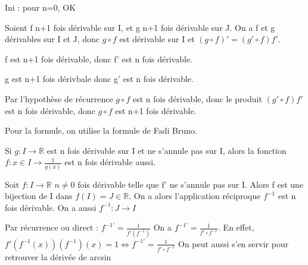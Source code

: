 \documentclass[french]{yLectureNote}
\begin{document}
\begin{myproof}
Ini : pour n=0, OK

Soient f n+1 fois dérivable sur I, et g n+1 fois dérivable sur J. On a f et g dérivables sur I et J, donc \(g\circ f\) est dérivable sur I et \((g\circ f)' = (g'\circ f)f'\).

f est n+1 fois dérivable, donc f' est n fois dérivable.

g est n+1 fois dérivbale donc g' est n fois dérivable.

Par l'hypothèse de récurrence \(g\circ f\) est n fois dérivable, donc le produit \((g'\circ f)f'\) est n fois dérivable, donc \(g\circ f\) est n+1 fois dérivable.

Pour la formule, on utilise la formule de Fadi Bruno.
\end{myproof}
\begin{proposition}
Si \(g : I\to \mathbb{R}\) est n fois dérivable sur I et ne s'annule pas sur I, alors la fonction \(f: x\in I\to \frac{1}{g(x)}\) est n fois dérivable aussi.
\end{proposition}
\begin{proposition}[]
Soit \(f:I\to\mathbb{R}\) $n\neq 0$ fois dérivable telle que f' ne s'annule pas sur I. Alors f est une bijection de I dans \(f(I) = J\in\mathbb{R}\). On a alors l'application réciproque \(f^{-1}\) est n fois dérivable. On a aussi \(f^{-1} : J\to I\)
\end{proposition}
\begin{myproof}
Par récurrence ou direct : \(f^{-1'} = \frac{1}{f'(f^{-1})}\) On a \(f^{-1'} = \frac{1}{f'\circ f^{-1}}\). En effet, \(f'(f^{-1}(x))(f^{-1})(x) = 1 \iff f^{-1'} = \frac{1}{f'\circ f^{-1}}\) On peut aussi s'en servir pour retrouver la dérivée de arcsin
\end{myproof}
\end{document}
